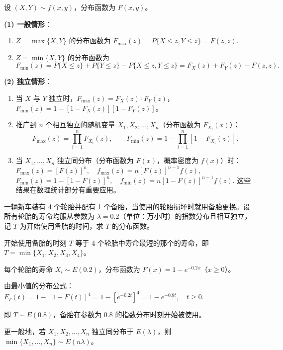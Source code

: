 \documentclass[lang=cn,11pt]{elegantbook}
\begin{document}
\begin{property}\label{prop:max-min-dist}
设 $(X,Y) \sim f(x,y)$，分布函数为 $F(x,y)$。

\textbf{(1) 一般情形}：
\begin{enumerate}
    \item $Z = \max\{X, Y\}$ 的分布函数为
    \(
    F_{\max}(z) = P\{X \leqslant z, Y \leqslant z\} = F(z, z).
    \)
    \item $Z = \min\{X, Y\}$ 的分布函数为
    \[
    F_{\min}(z) = P\{X \leqslant z\} + P\{Y \leqslant z\} - P\{X \leqslant z, Y \leqslant z\} = F_X(z) + F_Y(z) - F(z, z).
    \]
\end{enumerate}

\textbf{(2) 独立情形}：
\begin{enumerate}
    \item 当 $X$ 与 $Y$ 独立时，$F_{\max}(z) = F_X(z) \cdot F_Y(z)$，$F_{\min}(z) = 1 - [1 - F_X(z)][1 - F_Y(z)]$。
    \item 推广到 $n$ 个相互独立的随机变量 $X_1, X_2, \dots, X_n$（分布函数为 $F_{X_i}(x)$）：
    \[
    F_{\max}(z) = \prod_{i=1}^{n}F_{X_i}(z), \qquad F_{\min}(z) = 1 - \prod_{i=1}^{n}[1 - F_{X_i}(z)].
    \]
    \item 当 $X_1, \dots, X_n$ 独立同分布（分布函数为 $F(x)$，概率密度为 $f(x)$）时：
    \(
    F_{\max}(z) = [F(z)]^n, \quad f_{\max}(z) = n[F(z)]^{n-1}f(z),
    \)
    \(
    F_{\min}(z) = 1 - [1 - F(z)]^n, \quad f_{\min}(z) = n[1 - F(z)]^{n-1}f(z).
    \)
    这些结果在数理统计部分有重要应用。
\end{enumerate}
\end{property}

\begin{exercise}\label{exer:3-9}
一辆新车装有 4 个轮胎并配有 1 个备胎，当使用的轮胎损坏时就用备胎更换。设所有轮胎的寿命均服从参数为 $\lambda = 0.2$（单位：万小时）的指数分布且相互独立，记 $T$ 为开始使用备胎的时间，求 $T$ 的分布函数。
\end{exercise}

\begin{solution}
开始使用备胎的时刻 $T$ 等于 4 个轮胎中寿命最短的那个的寿命，即 $T = \min\{X_1, X_2, X_3, X_4\}$。

每个轮胎的寿命 $X_i \sim E(0.2)$，分布函数为 $F(x) = 1 - e^{-0.2x}$（$x \geqslant 0$）。

由最小值的分布公式：
\(
F_T(t) = 1 - [1 - F(t)]^4 = 1 - [e^{-0.2t}]^4 = 1 - e^{-0.8t}, \quad t \geqslant 0.
\)

即 $T \sim E(0.8)$，备胎在参数为 $0.8$ 的指数分布时刻开始被使用。

\begin{note}
更一般地，若 $X_1, X_2, \dots, X_n$ 独立同分布于 $E(\lambda)$，则 $\min\{X_1, \dots, X_n\} \sim E(n\lambda)$。
\end{note}
\end{solution}
\end{document}
